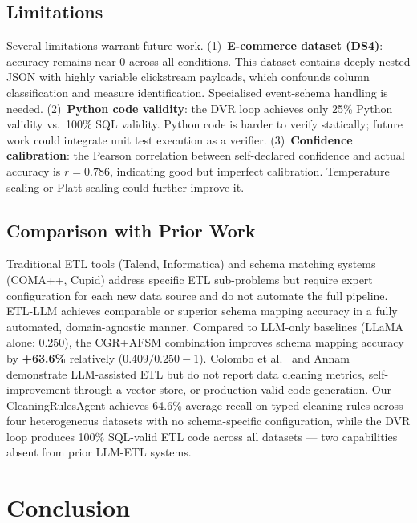 \documentclass[9pt,a4paper,twocolumn,twoside]{rho-class/rho}
\begin{document}
    \subsection{Limitations}

        Several limitations warrant future work. (1)~\textbf{E-commerce dataset (DS4)}: accuracy remains near 0 across all conditions. This dataset contains deeply nested JSON with highly variable clickstream payloads, which confounds column classification and measure identification. Specialised event-schema handling is needed. (2)~\textbf{Python code validity}: the DVR loop achieves only 25\% Python validity vs.\ 100\% SQL validity. Python code is harder to verify statically; future work could integrate unit test execution as a verifier. (3)~\textbf{Confidence calibration}: the Pearson correlation between self-declared confidence and actual accuracy is $r = 0.786$, indicating good but imperfect calibration. Temperature scaling or Platt scaling could further improve it.

    \subsection{Comparison with Prior Work}

        Traditional ETL tools (Talend, Informatica) and schema matching systems (COMA++, Cupid) address specific ETL sub-problems but require expert configuration for each new data source and do not automate the full pipeline. \textsc{ETL-LLM} achieves comparable or superior schema mapping accuracy in a fully automated, domain-agnostic manner. Compared to LLM-only baselines (LLaMA alone: 0.250), the CGR+AFSM combination improves schema mapping accuracy by \textbf{+63.6\%} relatively ($0.409/0.250 - 1$). Colombo et al.\ \cite{colombo2025llmetl} and Annam \cite{annam2025llm} demonstrate LLM-assisted ETL but do not report data cleaning metrics, self-improvement through a vector store, or production-valid code generation. Our CleaningRulesAgent achieves 64.6\% average recall on typed cleaning rules across four heterogeneous datasets with no schema-specific configuration, while the DVR loop produces 100\% SQL-valid ETL code across all datasets --- two capabilities absent from prior LLM-ETL systems.


\section{Conclusion}
\label{sec:conclusion}
\end{document}
